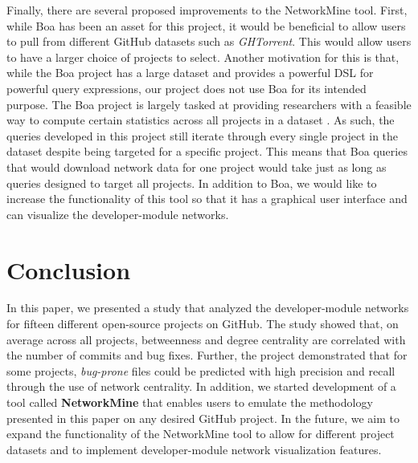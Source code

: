 \documentclass{sig-alternate-05-2015}
\begin{document}
Finally, there are several proposed improvements to the NetworkMine tool. First, while Boa has been an asset for this project, it would be beneficial to allow users to pull from different GitHub datasets such as \textit{GHTorrent}. This would allow users to have a larger choice of projects to select. Another motivation for this is that, while the Boa project has a large dataset and provides a powerful DSL for powerful query expressions, our project does not use Boa for its intended purpose. The Boa project is largely tasked at providing researchers with a feasible way to compute certain statistics across all projects in a dataset \cite{Dyer:Boa}. As such, the queries developed in this project still iterate through every single project in the dataset despite being targeted for a specific project. This means that Boa queries that would download network data for one project would take just as long as queries designed to target all projects. In addition to Boa, we would like to increase the functionality of this tool so that it has a graphical user interface and can visualize the developer-module networks. 

\section{Conclusion}
In this paper, we presented a study that analyzed the developer-module networks for fifteen different open-source projects on GitHub. The study showed that, on average across all projects, betweenness and degree centrality are correlated with the number of commits and bug fixes. Further, the project demonstrated that for some projects, \textit{bug-prone} files could be predicted with high precision and recall through the use of network centrality. In addition, we started development of a tool called \textbf{NetworkMine} that enables users to emulate the methodology presented in this paper on any desired GitHub project. In the future, we aim to expand the functionality of the NetworkMine tool to allow for different project datasets and to implement developer-module network visualization features.




\balancecolumns
\end{document}
